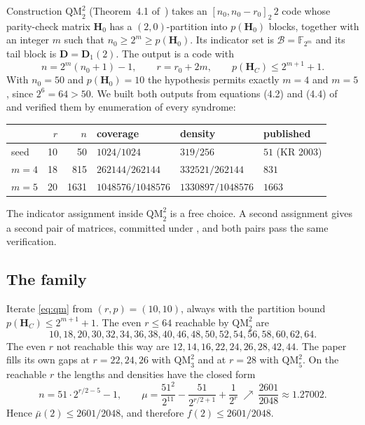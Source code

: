 \documentclass[11pt,a4paper]{article}
\newcommand{\FF}{\mathbb{F}}
\newcommand{\HH}{\boldsymbol{H}}
\theoremstyle{remark}
\begin{document}
Construction $\mathrm{QM}_2^2$ (Theorem~4.1 of~\cite{DMP2025}) takes an
$[n_0,n_0-r_0]_2\,2$ code whose parity-check matrix $\HH_0$ has a
$(2,0)$-partition into $p(\HH_0)$ blocks, together with an integer $m$
such that $n_0\ge 2^m\ge p(\HH_0)$. Its indicator set is
$\mathscr{B}=\FF_{2^m}$ and its tail block is
$\boldsymbol{D}=\boldsymbol{D}_1(2)$. The output is a code with
\begin{equation}
\label{eq:qm}
n=2^m(n_0+1)-1,\qquad r=r_0+2m,\qquad p(\HH_C)\le 2^{m+1}+1 .
\end{equation}
With $n_0=50$ and $p(\HH_0)=10$ the hypothesis permits exactly $m=4$
and $m=5$, since $2^6=64>50$. We built both outputs from equations
(4.2) and (4.4) of~\cite{DMP2025} and verified them by enumeration of
every syndrome:

\begin{center}
\renewcommand{\arraystretch}{1.15}
\begin{tabular}{@{}lrrlll@{}}
\toprule
 & $r$ & $n$ & coverage & density & published \\
\midrule
seed & 10 & 50 & $1024/1024$ & $319/256$ & $51$ (KR 2003) \\
$m=4$ & 18 & 815 & $262144/262144$ & $332521/262144$ & $831$ \\
$m=5$ & 20 & 1631 & $1048576/1048576$ & $1330897/1048576$ & $1663$ \\
\bottomrule
\end{tabular}
\end{center}

The indicator assignment inside $\mathrm{QM}_2^2$ is a free choice. A
second assignment gives a second pair of matrices, committed under
, and both pairs pass the same verification.

\subsection{The family}

Iterate \eqref{eq:qm} from $(r,p)=(10,10)$, always with the partition
bound $p(\HH_C)\le 2^{m+1}+1$. The even $r\le 64$ reachable by
$\mathrm{QM}_2^2$ are
\[
10,18,20,30,32,34,36,38,40,46,48,50,52,54,56,58,60,62,64 .
\]
The even $r$ not reachable this way are $12,14,16,22,24,26,28,42,44$.
The paper fills its own gaps at $r=22,24,26$ with $\mathrm{QM}_3^2$ and
at $r=28$ with $\mathrm{QM}_5^2$. On the reachable $r$ the lengths and
densities have the closed form
\[
n=51\cdot 2^{r/2-5}-1,\qquad
\mu=\frac{51^2}{2^{11}}-\frac{51}{2^{r/2+1}}+\frac{1}{2^r}
\ \nearrow\ \frac{2601}{2048}\approx 1.27002 .
\]
Hence $\bar\mu(2)\le 2601/2048$, and therefore
$f(2)\le 2601/2048$.
\end{document}
